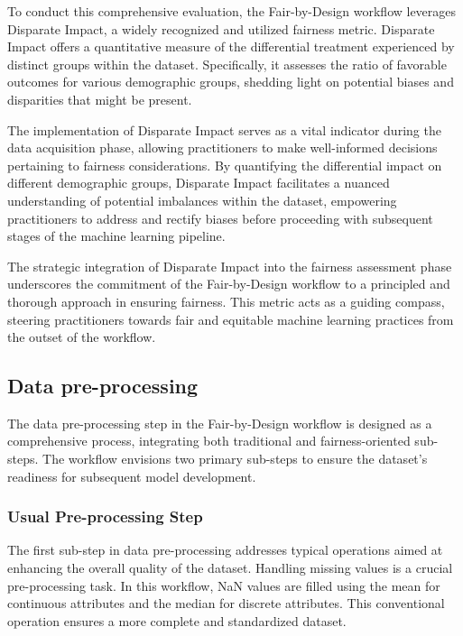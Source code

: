 \documentclass[12pt,a4paper,openright,twoside]{book}
\begin{document}
To conduct this comprehensive evaluation, the Fair-by-Design workflow leverages Disparate Impact, a widely recognized and utilized fairness metric. Disparate Impact offers a quantitative measure of the differential treatment experienced by distinct groups within the dataset. Specifically, it assesses the ratio of favorable outcomes for various demographic groups, shedding light on potential biases and disparities that might be present.

The implementation of Disparate Impact serves as a vital indicator during the data acquisition phase, allowing practitioners to make well-informed decisions pertaining to fairness considerations. By quantifying the differential impact on different demographic groups, Disparate Impact facilitates a nuanced understanding of potential imbalances within the dataset, empowering practitioners to address and rectify biases before proceeding with subsequent stages of the machine learning pipeline.

The strategic integration of Disparate Impact into the fairness assessment phase underscores the commitment of the Fair-by-Design workflow to a principled and thorough approach in ensuring fairness. This metric acts as a guiding compass, steering practitioners towards fair and equitable machine learning practices from the outset of the workflow.

\subsection{Data pre-processing}

The data pre-processing step in the Fair-by-Design workflow is designed as a comprehensive process, integrating both traditional and fairness-oriented sub-steps. The workflow envisions two primary sub-steps to ensure the dataset's readiness for subsequent model development.

\subsubsection{Usual Pre-processing Step}

The first sub-step in data pre-processing addresses typical operations aimed at enhancing the overall quality of the dataset. Handling missing values is a crucial pre-processing task. In this workflow, NaN values are filled using the mean for continuous attributes and the median for discrete attributes. This conventional operation ensures a more complete and standardized dataset.
\end{document}
